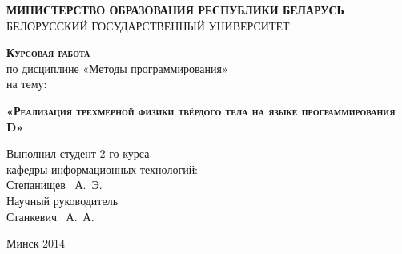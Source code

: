 \begin{titlepage}
\newpage

\begin{center}
\textsc{\textbf{МИНИСТЕРСТВО ОБРАЗОВАНИЯ РЕСПУБЛИКИ БЕЛАРУСЬ}} \\
\vspace{1cm}
БЕЛОРУССКИЙ ГОСУДАРСТВЕННЫЙ УНИВЕРСИТЕТ \\
\end{center}
 
\vspace{8em}

\begin{center}
\Large \textsc{\textbf{Курсовая работа}} \\
по дисциплине  «Методы программирования» \\
на тему:
\end{center}

\vspace{2.5em}
 
\begin{center}
\textsc{\textbf{«Реализация трехмерной физики твёрдого тела \linebreak на языке программирования D»}}
\end{center}

\vspace{12em}
 
\begin{flushleft}
Выполнил студент 2-го курса \\
кафедры информационных технологий: \\
Степанищев ~А.~Э. \\
\vspace{1.5em}
Научный руководитель \\
Станкевич ~А.~А.\\
\vspace{1.5em}
\end{flushleft}
 
\vspace{\fill}

\begin{center}
Минск 2014
\end{center}

\end{titlepage} 
